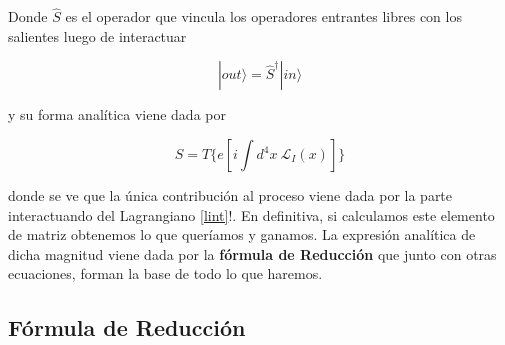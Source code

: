 \documentclass{article}
\numberwithin{equation}{section}
\begin{document}
Donde $\hat{S}$ es el operador que vincula los operadores entrantes libres con los salientes luego de interactuar

\begin{equation}\label{key}
|out\rangle=\hat{S}^{\dagger}|in\rangle
\end{equation}

y su forma analítica viene dada por

\begin{equation}\label{key}
S=T\{e\left[i\int d^4 x \ \mathcal{L}_I(x)\right]\}
\end{equation} 

donde se ve que la única contribución al proceso viene dada por la parte interactuando del Lagrangiano \ref{lint}!. En definitiva, si calculamos este elemento de matriz obtenemos lo que queríamos y ganamos. La expresión analítica de dicha magnitud
viene dada por la \textbf{fórmula de Reducción} que
junto con otras ecuaciones, forman la base de todo lo que haremos.

\subsection{Fórmula de Reducción}
\end{document}
